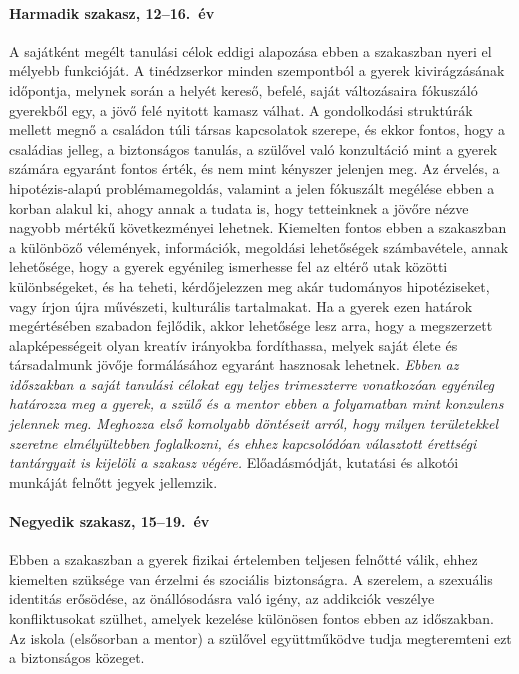 \hypertarget{harmadik-szakasz-1216-ev}{%
\paragraph{Harmadik szakasz, 12--16.\
év}\label{harmadik-szakasz-1216-ev}}

A sajátként megélt tanulási célok eddigi alapozása ebben a szakaszban
nyeri el mélyebb funkcióját. A tinédzserkor minden szempontból a gyerek
kivirágzásának időpontja, melynek során a helyét kereső, befelé, saját
változásaira fókuszáló gyerekből egy, a jövő felé nyitott kamasz válhat.
A gondolkodási struktúrák mellett megnő a családon túli társas
kapcsolatok szerepe, és ekkor fontos, hogy a családias jelleg, a
biztonságos tanulás, a szülővel való konzultáció mint a gyerek számára
egyaránt fontos érték, és nem mint kényszer jelenjen meg. Az érvelés, a
hipotézis-alapú problémamegoldás, valamint a jelen fókuszált megélése
ebben a korban alakul ki, ahogy annak a tudata is, hogy tetteinknek a
jövőre nézve nagyobb mértékű következményei lehetnek. Kiemelten fontos
ebben a szakaszban a különböző vélemények, információk, megoldási
lehetőségek számbavétele, annak lehetősége, hogy a gyerek egyénileg
ismerhesse fel az eltérő utak közötti különbségeket, és ha teheti,
kérdőjelezzen meg akár tudományos hipotéziseket, vagy írjon újra
művészeti, kulturális tartalmakat. Ha a gyerek ezen határok megértésében
szabadon fejlődik, akkor lehetősége lesz arra, hogy a megszerzett
alapképességeit olyan kreatív irányokba fordíthassa, melyek saját élete
és társadalmunk jövője formálásához egyaránt hasznosak lehetnek.
\emph{Ebben az időszakban a saját tanulási célokat egy teljes
trimeszterre vonatkozóan egyénileg határozza meg a gyerek, a szülő és a
mentor ebben a folyamatban mint konzulens jelennek meg. Meghozza első
komolyabb döntéseit arról, hogy milyen területekkel szeretne
elmélyültebben foglalkozni, és ehhez kapcsolódóan választott érettségi
tantárgyait is kijelöli a szakasz végére.} Előadásmódját, kutatási és
alkotói munkáját felnőtt jegyek jellemzik.

\hypertarget{negyedik-szakasz-1519-ev}{%
\paragraph{Negyedik szakasz, 15--19.\
év}\label{negyedik-szakasz-1519-ev}}

Ebben a szakaszban a gyerek fizikai értelemben teljesen felnőtté válik,
ehhez kiemelten szüksége van érzelmi és szociális biztonságra. A
szerelem, a szexuális identitás erősödése, az önállósodásra való igény,
az addikciók veszélye konfliktusokat szülhet, amelyek kezelése különösen
fontos ebben az időszakban. Az iskola (elsősorban a mentor) a szülővel
együttműködve tudja megteremteni ezt a biztonságos közeget.

